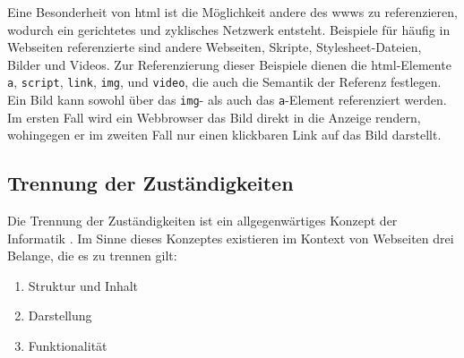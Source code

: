             Eine Besonderheit von \gls{html} ist die Möglichkeit
            andere {\resources} des \glspl{www} zu referenzieren,
            wodurch ein gerichtetes und zyklisches Netzwerk entsteht.
            Beispiele für häufig in Webseiten referenzierte {\resources}
            sind andere Webseiten, Skripte, Stylesheet-Dateien, Bilder und Videos.
            Zur Referenzierung dieser Beispiele dienen die \gls{html}-Elemente
            \texttt{a}, \texttt{script}, \texttt{link}, \texttt{img}, und \texttt{video},
            die auch die Semantik der Referenz festlegen.
            Ein Bild kann sowohl über das \texttt{img}-
            als auch das \texttt{a}-Element referenziert werden.
            Im ersten Fall wird ein Webbrowser das Bild direkt in die Anzeige rendern,
            wohingegen er im zweiten Fall nur einen klickbaren Link auf das Bild darstellt.

        \subsection{Trennung der Zuständigkeiten}
            \label{section:problemAnalysisWebpagesInTheWWWSeparationOfConcerns}
            Die Trennung der Zuständigkeiten
            ist ein allgegenwärtiges Konzept der Informatik \cite{huersch:SeparationOfConcerns}.
            Im Sinne dieses Konzeptes existieren im Kontext von Webseiten
            drei Belange, die es zu trennen gilt:

            \begin{enumerate}
                \item Struktur und Inhalt
                \item Darstellung
                \item Funktionalität
            \end{enumerate}

